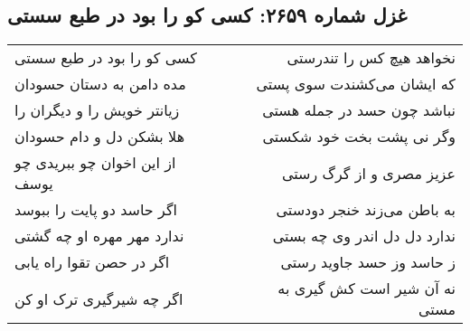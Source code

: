 \begin{center}
\section*{غزل شماره ۲۶۵۹: کسی کو را بود در طبع سستی}
\label{sec:2659}
\begin{longtable}{l p{0.5cm} r}
کسی کو را بود در طبع سستی
&&
نخواهد هیچ کس را تندرستی
\\
مده دامن به دستان حسودان
&&
که ایشان می‌کشندت سوی پستی
\\
زیانتر خویش را و دیگران را
&&
نباشد چون حسد در جمله هستی
\\
هلا بشکن دل و دام حسودان
&&
وگر نی پشت بخت خود شکستی
\\
از این اخوان چو ببریدی چو یوسف
&&
عزیز مصری و از گرگ رستی
\\
اگر حاسد دو پایت را ببوسد
&&
به باطن می‌زند خنجر دودستی
\\
ندارد مهر مهره او چه گشتی
&&
ندارد دل دل اندر وی چه بستی
\\
اگر در حصن تقوا راه یابی
&&
ز حاسد وز حسد جاوید رستی
\\
اگر چه شیرگیری ترک او کن
&&
نه آن شیر است کش گیری به مستی
\\
\end{longtable}
\end{center}
